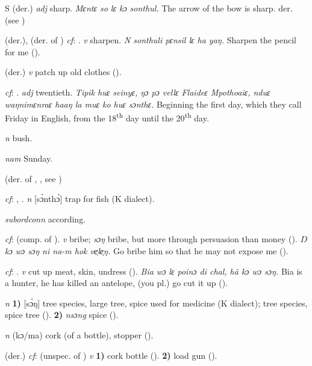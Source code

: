 \begin{letter}{S}
 (der.) \textit{adj} sharp. \textit{Mɛntɛ so lɛ kɔ sonthul.} The arrow of the bow is sharp. der.  (see )

 (der.), (der. of ) \textit{cf}: . \textit{v} sharpen. \textit{N sonthuli pɛnsil lɛ ha yaŋ.} Sharpen the pencil for me (\citealt{Pichl1967}). 

 (der.) \textit{v} patch up old clothes (\citealt{Pichl1967}).

 \textit{cf}: . \textit{adj} twentieth. \textit{Tipik huɛ seinyɛ, ŋɔ pɔ vellɛ Flaideɛ Mpothoaiɛ, nduɛ waŋnimɛnraɛ haaŋ la muɛ ko huɛ sɔnthɛ.} Beginning the first day, which they call Friday in English, from the 18\textsuperscript{th} day until the 20\textsuperscript{th} day.

 \textit{n} bush.

 \textit{nam} Sunday.

 (der. of , , see ) 

 \textit{cf}: , . \textit{n} [sɔ̀nthɔ̀] trap for fish (K dialect). 

 \textit{subordconn} according.

 \textit{cf}:  (comp. of ). \textit{v} bribe; \textit{sɔŋ} bribe, but more through persuasion than money (\citealt{Pichl1967}). \textit{Ŋ kɔ wɔ sɔŋ ni na-m hok ve̹le̹ŋ.} Go bribe him so that he may not expose me (\citealt{Pichl1967}). 

 \textit{cf}: . \textit{v} cut up meat, skin, undress (\citealt{Pichl1967}). \textit{Bia wɔ lɛ poinɔ di chal, hã kɔ wɔ sɔŋ.} Bia is a hunter, he has killed an antelope, (you pl.) go cut it up (\citealt{Pichl1967}). 

 \textit{n} \textbf{1)} [sɔ̀ŋ] tree species, large tree, spice used for medicine (K dialect); tree species, spice tree (\citealt{Pichl1967}). \textbf{2)} \textit{nsɔng} spice (\citealt{Pichl1967}).

 \textit{n} (kɔ/ma) cork (of a bottle), stopper (\citealt{Pichl1967}). 

 (der.) \textit{cf}:  (unspec. of ) \textit{v} \textbf{1)} cork bottle (\citealt{Pichl1967}). \textbf{2)} load gun (\citealt{Pichl1967}).


\end{letter}

